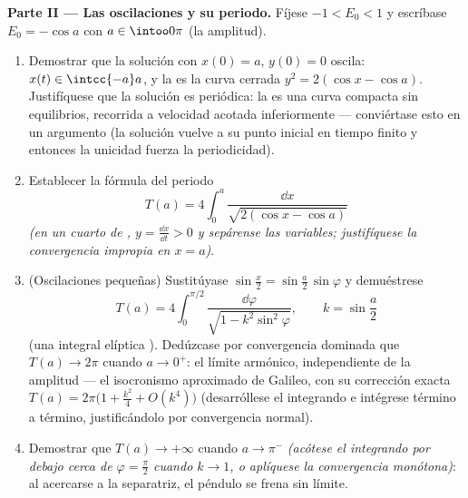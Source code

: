 \begin{problem}
\medskip
\noindent\textbf{Parte II --- Las oscilaciones y su periodo.} Fíjese
$-1 < E_0 < 1$ y escríbase $E_0 = -\cos a$ con $a \in
\intoo0\pi$ (la amplitud).
\begin{enumerate}[resume]
  \item Demostrar que la solución con $x(0) = a$, $y(0) = 0$ oscila:
  $x(t) \in \intcc{-a}a$, y la  es
  la curva cerrada $y^2 = 2(\cos x - \cos a)$. Justifíquese que la
  solución es periódica: la  es una
  curva compacta sin equilibrios,
  recorrida a velocidad acotada inferiormente --- conviértase esto en un
  argumento (la solución vuelve a su punto inicial en tiempo finito y
  entonces la unicidad fuerza la periodicidad). \item Establecer la
  fórmula del periodo
        \[
        T(a) = 4\int_0^{a}\frac{\dd x}{\sqrt{2(\cos x -
        \cos a)}}
        \]
        \emph{(en un cuarto de ,
        $y = \frac{\dd x}{\dd t} >
        0$ y sepárense las variables; justifíquese la convergencia
        impropia en $x = a$)}. \item (Oscilaciones pequeñas) Sustitúyase
        $\sin\frac x2 =
        \sin\frac a2\,\sin\varphi$ y demuéstrese
        \[
        T(a) = 4\int_0^{\pi/2}\frac{\dd\varphi}{\sqrt{1 -
        k^2\sin^2\varphi}},
        \qquad k = \sin\frac a2
        \]
        (una integral elíptica
        ). Dedúzcase por
        convergencia dominada que $T(a) \to 2\pi$ cuando $a \to 0^+$: el
        límite armónico, independiente de la amplitud --- el isocronismo
        aproximado de Galileo, con su corrección exacta
        $T(a) = 2\pi\bigl(1 + \frac{k^2}4 +
        O(k^4)\bigr)$ (desarróllese el integrando e intégrese término a
        término, justificándolo por convergencia normal). \item
        Demostrar que $T(a) \to +\infty$ cuando $a \to \pi^-$
        \emph{(acótese el integrando por debajo cerca de $\varphi =
        \frac\pi2$ cuando $k \to 1$, o aplíquese la convergencia
        monótona)}: al acercarse a la separatriz, el péndulo se frena
        sin límite.
\end{enumerate}


\end{problem}
